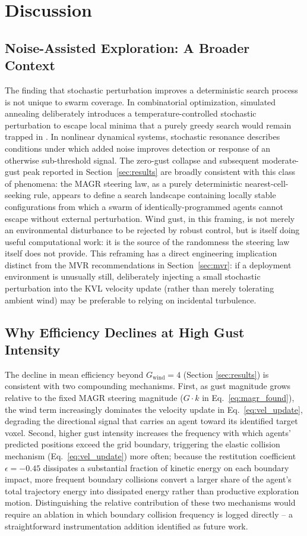\documentclass[10pt,journal]{IEEEtran}
\begin{document}
\section{Discussion}
\label{sec:discussion}

\subsection{Noise-Assisted Exploration: A Broader Context}
The finding that stochastic perturbation improves a deterministic search
process is not unique to swarm coverage. In combinatorial optimization,
simulated annealing deliberately introduces a temperature-controlled
stochastic perturbation to escape local minima that a purely greedy search
would remain trapped in \cite{kirkpatrick1983}. In nonlinear dynamical
systems, stochastic resonance describes conditions under which added noise
improves detection or response of an otherwise sub-threshold signal. The
zero-gust collapse and subsequent moderate-gust peak reported in
Section~\ref{sec:results} are broadly consistent with this class of
phenomena: the MAGR steering law, as a purely deterministic
nearest-cell-seeking rule, appears to define a search landscape containing
locally stable configurations from which a swarm of identically-programmed
agents cannot escape without external perturbation. Wind gust, in this
framing, is not merely an environmental disturbance to be rejected by
robust control, but is itself doing useful computational work: it is the
source of the randomness the steering law itself does not provide. This
reframing has a direct engineering implication distinct from the MVR
recommendations in Section~\ref{sec:mvr}: if a deployment environment is
unusually still, deliberately injecting a small stochastic perturbation
into the KVL velocity update (rather than merely tolerating ambient wind)
may be preferable to relying on incidental turbulence.

\subsection{Why Efficiency Declines at High Gust Intensity}
The decline in mean efficiency beyond $G_{\text{wind}}=4$ (Section
\ref{sec:results}) is consistent with two compounding mechanisms. First, as
gust magnitude grows relative to the fixed MAGR steering magnitude ($G
\cdot k$ in Eq.~\ref{eq:magr_found}), the wind term increasingly dominates
the velocity update in Eq.~\ref{eq:vel_update}, degrading the directional
signal that carries an agent toward its identified target voxel. Second,
higher gust intensity increases the frequency with which agents' predicted
positions exceed the grid boundary, triggering the elastic collision
mechanism (Eq.~\ref{eq:vel_update}) more often; because the restitution
coefficient $\epsilon=-0.45$ dissipates a substantial fraction of kinetic
energy on each boundary impact, more frequent boundary collisions convert
a larger share of the agent's total trajectory energy into dissipated
energy rather than productive exploration motion. Distinguishing the
relative contribution of these two mechanisms would require an ablation
in which boundary collision frequency is logged directly -- a
straightforward instrumentation addition identified as future work.
\end{document}
